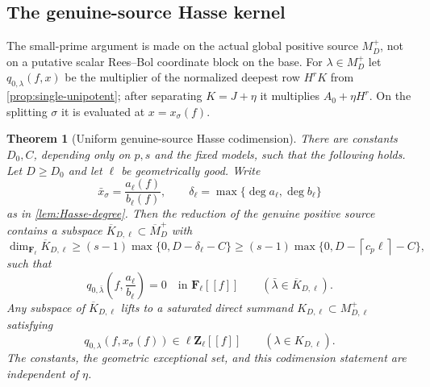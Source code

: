 \documentclass[11pt]{article}
\newtheorem{theorem}{Theorem}[section]
\theoremstyle{definition}
\theoremstyle{remark}
\newcommand{\Z}{\mathbf Z}
\newcommand{\F}{\mathbf F}
\newcommand{\ceil}[1]{\left\lceil #1\right\rceil}
\begin{document}
\subsection{The genuine-source Hasse kernel}

The small-prime argument is made on the actual global positive source
$M_D^+$, not on a putative scalar Rees--Bol coordinate block on the base.
For $\lambda\in M_D^+$ let $q_{0,\lambda}(f,x)$ be the multiplier of
the normalized deepest row $H^rK$ from \cref{prop:single-unipotent}; after
separating $K=J+\eta$ it multiplies $A_0+\eta H^r$.  On the splitting $\sigma$ it is evaluated at
$x=x_\sigma(f)$.

\begin{theorem}[Uniform genuine-source Hasse codimension]
\label{thm:genuine-Hasse}
There are constants $D_0,C$, depending only on $p,s$ and the fixed models,
such that the following holds.  Let $D\ge D_0$ and let
$\ell$ be geometrically good.  Write
\[
 \bar x_\sigma=\frac{a_\ell(f)}{b_\ell(f)},
 \qquad
 \delta_\ell=\max\{\deg a_\ell,\deg b_\ell\}
\]
as in \cref{lem:Hasse-degree}.  Then the reduction of the genuine positive
source contains a subspace
$\overline K_{D,\ell}\subset\overline M_D^+$ with
\begin{equation}\label{eq:kernel-rank}
 \boxed{
 \dim_{\F_\ell}\overline K_{D,\ell}
 \ge (s-1)\max\{0,D-\delta_\ell-C\}
 \ge (s-1)\max\{0,D-\ceil{c_p\ell}-C\},}
\end{equation}
such that
\begin{equation}\label{eq:q0-mod-l-zero}
 q_{0,\bar\lambda}\!\left(f,\frac{a_\ell}{b_\ell}\right)=0
 \quad\text{in }\F_\ell[[f]]
 \qquad(\bar\lambda\in\overline K_{D,\ell}).
\end{equation}
Any subspace of $\overline K_{D,\ell}$ lifts to a saturated direct summand
$K_{D,\ell}\subset M^+_{D,\ell}$ satisfying
\begin{equation}\label{eq:q0-l-divisible}
 q_{0,\lambda}(f,x_\sigma(f))\in\ell\Z_\ell[[f]]
 \qquad(\lambda\in K_{D,\ell}).
\end{equation}
The constants, the geometric exceptional set, and this codimension statement
are independent of $\eta$.
\end{theorem}
\end{document}
